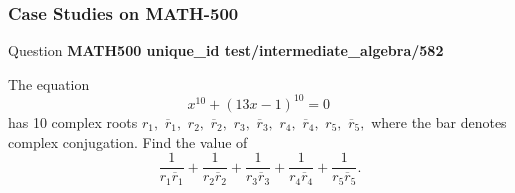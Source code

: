 \subsubsection{Case Studies on MATH-500}
\label{supp_sec:math500_case}


\begin{questionbox}{ Question }
\textbf{MATH500 unique\_id test/intermediate\_algebra/582}


The equation
\[x^{10}+(13x-1)^{10}=0\,\]has 10 complex roots $r_1,$ $\overline{r}_1,$ $r_2,$ $\overline{r}_2,$ $r_3,$ $\overline{r}_3,$ $r_4,$ $\overline{r}_4,$ $r_5,$ $\overline{r}_5,$ where the bar denotes complex conjugation. Find the value of
\[\frac 1{r_1\overline{r}_1}+\frac 1{r_2\overline{r}_2}+\frac 1{r_3\overline{r}_3}+\frac 1{r_4\overline{r}_4}+\frac 1{r_5\overline{r}_5}.\]

\end{questionbox}

